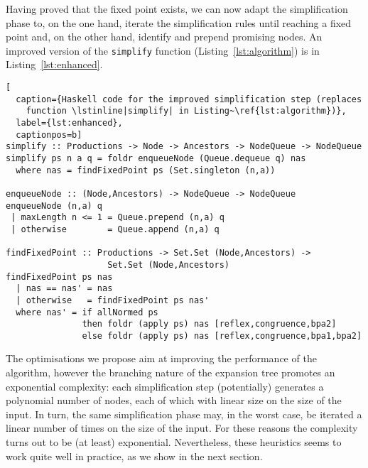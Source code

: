 Having proved that the fixed point exists, we can now adapt the
simplification phase to, on the one hand, iterate the simplification
rules until reaching a fixed point and, on the other hand, identify
and prepend promising nodes. An improved version of the
\lstinline|simplify| function (Listing~\ref{lst:algorithm}) is in
Listing~\ref{lst:enhanced}.

\begin{lstlisting}[
  caption={Haskell code for the improved simplification step (replaces
    function \lstinline|simplify| in Listing~\ref{lst:algorithm})},
  label={lst:enhanced},
  captionpos=b]
simplify :: Productions -> Node -> Ancestors -> NodeQueue -> NodeQueue
simplify ps n a q = foldr enqueueNode (Queue.dequeue q) nas
  where nas = findFixedPoint ps (Set.singleton (n,a))

enqueueNode :: (Node,Ancestors) -> NodeQueue -> NodeQueue
enqueueNode (n,a) q
 | maxLength n <= 1 = Queue.prepend (n,a) q
 | otherwise        = Queue.append (n,a) q

findFixedPoint :: Productions -> Set.Set (Node,Ancestors) -> 
                    Set.Set (Node,Ancestors)
findFixedPoint ps nas
  | nas == nas' = nas
  | otherwise   = findFixedPoint ps nas'
  where nas' = if allNormed ps
               then foldr (apply ps) nas [reflex,congruence,bpa2]
               else foldr (apply ps) nas [reflex,congruence,bpa1,bpa2]
\end{lstlisting}

The optimisations we propose aim at improving the performance of the
algorithm, however the branching nature of the expansion tree promotes
an exponential complexity: each simplification step (potentially)
generates a polynomial number of nodes, each of which with linear size
on the size of the input.  In turn, the same simplification phase may,
in the worst case, be iterated a linear number of times on the size of
the input.  For these reasons the complexity turns out to be (at least)
exponential.  Nevertheless, these heuristics seems to work quite well
in practice, as we show in the next section.

